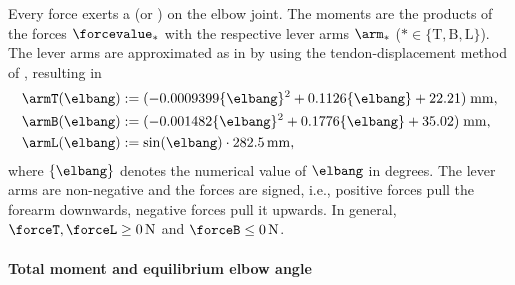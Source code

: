 Every force exerts a  (or ) on the elbow joint.
The moments are the products of the forces $\forcevalue_\ast$
with the respective lever arms $\arm_\ast$
($\ast \in \{\mathrm{T}, \mathrm{B}, \mathrm{L}\}$).
The lever arms are approximated as in
 by using
the tendon-displacement method of \cite{An84Determination},
resulting in
\begin{subequations}
  \begin{align}
    \armT(\elbang)
    &:= (-0.0009399 \{\elbang\}^2 + 0.1126 \{\elbang\} + 22.21)\;
    \si{\milli\meter},\\
    \armB(\elbang)
    &:= (-0.001482 \{\elbang\}^2 + 0.1776 \{\elbang\} + 35.02)\;
    \si{\milli\meter},\\
    \armL(\elbang)
    &:= \sin(\elbang) \cdot \SI{282.5}{\milli\meter},
  \end{align}
\end{subequations}
where $\{\elbang\}$ denotes the numerical value of $\elbang$
in degrees.
The lever arms are non-negative and the forces are signed, i.e.,
positive forces pull the forearm downwards,
negative forces pull it upwards.
In general, $\forceT, \forceL \ge \SI{0}{\newton}$ and
$\forceB \le \SI{0}{\newton}$.

\paragraph{Total moment and equilibrium elbow angle}

